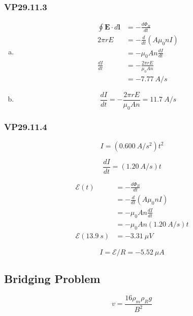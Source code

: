 \documentclass{article}
\begin{document}
\subsubsection{VP29.11.3}

\begin{enumerate}[(a)]
  \item

        \begin{align*}
          \oint \mathbf{E} \cdot d \mathbf{l} & = -\frac{d \Phi_B}{dt}         \\
          2 \pi r E                           & = -\frac{d}{dt} (A \mu_0 n I)  \\
                                              & = -\mu_0 A n \frac{dI}{dt}     \\
          \frac{dI}{dt}                       & = -\frac{2 \pi r E}{\mu_0 A n} \\
                                              & = -\qty{7.77}{A/s}
        \end{align*}

  \item \[\frac{dI}{dt} = -\frac{2 \pi r E}{\mu_0 A n} = \qty{11.7}{A/s}\]
\end{enumerate}

\subsubsection{VP29.11.4}

\[I = (\qty{0.600}{A/s^2}) t^2\]

\[\frac{dI}{dt} = (\qty{1.20}{A/s}) t\]

\begin{align*}
  \mathcal{E}(t)             & = -\frac{d \Phi_B}{dt}           \\
                             & = -\frac{d}{dt} (A \mu_0 n I)    \\
                             & = -\mu_0 A n \frac{dI}{dt}       \\
                             & = -\mu_0 A n (\qty{1.20}{A/s}) t \\
  \mathcal{E}(\qty{13.9}{s}) & = \qty{-3.31}{\mu V}
\end{align*}

\[I = \mathcal{E} / R = \qty{-5.52}{\mu A}\]

\subsection{Bridging Problem}

\[v = \frac{16 \rho_m \rho_R g}{B^2}\]
\end{document}
